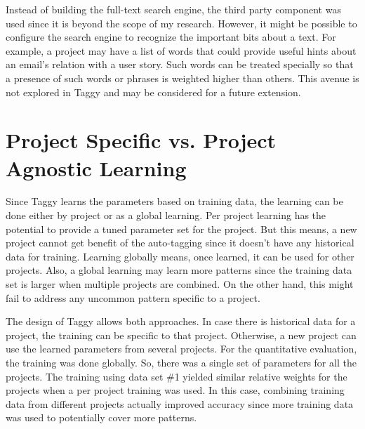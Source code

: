 Instead of building the full-text search engine, the third party component was used since it is beyond the scope of my research. However, it might be possible to configure the search engine to recognize the important bits about a text. For example, a project may have a list of words that could provide useful hints about an email's relation with a user story. Such words can be treated specially so that a presence of such words or phrases is weighted higher than others. This avenue is not explored in Taggy and may be considered for a future extension.

\section {Project Specific vs. Project Agnostic Learning}
Since Taggy learns the parameters based on training data, the learning can be done either by project or as a global learning. Per project learning has the potential to provide a tuned parameter set for the project. But this means, a new project cannot get benefit of the auto-tagging since it doesn't have any historical data for training. Learning globally means, once learned, it can be used for other projects. Also, a global learning may learn more patterns since the training data set is larger when multiple projects are combined. On the other hand, this might fail to address any uncommon pattern specific to a project. 

The design of Taggy allows both approaches. In case there is historical data for a project, the training can be specific to that project. Otherwise, a new project can use the learned parameters from several projects. For the quantitative evaluation, the training was done globally. So, there was a single set of parameters for all the projects. The training using data set \#1 yielded similar relative weights for the projects when a per project training was used. In this case, combining training data from different projects actually improved accuracy since more training data was used to potentially cover more patterns.

